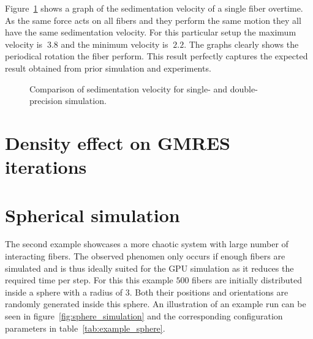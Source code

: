 \documentclass[a4paper,11pt]{kth-mag}
\begin{document}
Figure~\ref{fig:ring_sedimentation_velocity} shows a graph of the sedimentation velocity of a single fiber overtime. As the same force acts on all fibers and they perform the same motion they all have the same sedimentation velocity. For this particular setup the maximum velocity is $~3.8$ and the minimum velocity is $~2.2$. The graphs clearly shows the periodical rotation the fiber perform. This result perfectly captures the expected result obtained from prior simulation and experiments.


\begin{figure}[!htbp]
  \centering
  \caption{Comparison of sedimentation velocity for single- and double-precision simulation.}
  \label{fig:ring_sedimentation_velocity}
\end{figure}

\section{Density effect on GMRES iterations}

\section{Spherical simulation}
\label{sec:example_sphere}

The second example showcases a more chaotic system with large number of interacting fibers. The observed phenomen only occurs if enough fibers are simulated and is thus ideally suited for the GPU simulation as it reduces the required time per step. For this this example $500$ fibers are initially distributed inside a sphere with a radius of $3$. Both their positions and orientations are randomly generated inside this sphere. An illustration of an example run can be seen in figure~\ref{fig:sphere_simulation} and the corresponding configuration parameters in table~\ref{tab:example_sphere}.
\end{document}

